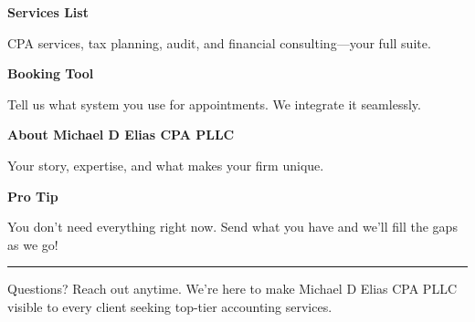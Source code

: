 \documentclass[11pt,letterpaper]{article}
\begin{document}
\hfill
\begin{minipage}[t]{0.48\textwidth}
\begin{tcolorbox}[colframe=accent-teal, boxrule=1pt, left=0.7em, right=0.7em, top=0.5em, bottom=0.5em, arc=4pt, boxsep=0pt]
{\bfseries\small\color{accent-teal}Services List}

\vspace{0.15em}

{\small CPA services, tax planning, audit, and financial consulting—your full suite.}
\end{tcolorbox}

\vspace{0.1em}

\begin{tcolorbox}[colframe=accent-teal, boxrule=1pt, left=0.7em, right=0.7em, top=0.5em, bottom=0.5em, arc=4pt, boxsep=0pt]
{\bfseries\small\color{accent-teal}Booking Tool}

\vspace{0.15em}

{\small Tell us what system you use for appointments. We integrate it seamlessly.}
\end{tcolorbox}

\vspace{0.1em}

\begin{tcolorbox}[colframe=accent-teal, boxrule=1pt, left=0.7em, right=0.7em, top=0.5em, bottom=0.5em, arc=4pt, boxsep=0pt]
{\bfseries\small\color{accent-teal}About Michael D Elias CPA PLLC}

\vspace{0.15em}

{\small Your story, expertise, and what makes your firm unique.}
\end{tcolorbox}

\vspace{-0.2em}
\end{minipage}

\vspace{0.15em}

\begin{tcolorbox}[colback={accent-red!5}, colframe=accent-red!20, boxrule=0.5pt, left=0.7em, right=0.7em, top=0.4em, bottom=0.4em, arc=6pt, boxsep=0pt]

{\bfseries\small\color{accent-red}Pro Tip}

\vspace{0.1em}

{\small You don't need everything right now. Send what you have and we'll fill the gaps as we go!}

\end{tcolorbox}

\vspace{0.15em}

\noindent\hrule
\vspace{0.2em}

{\small\color{text-light}Questions? Reach out anytime. We're here to make Michael D Elias CPA PLLC visible to every client seeking top-tier accounting services.}
\end{document}
